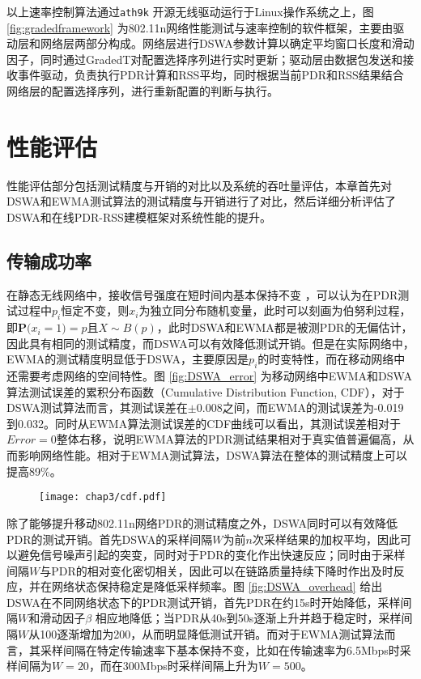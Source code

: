 以上速率控制算法通过\texttt{ath9k} 开源无线驱动运行于Linux操作系统之上，图 \ref{fig:gradedframework} 为802.11n网络性能测试与速率控制的软件框架，主要由驱动层和网络层两部分构成。网络层进行DSWA参数计算以确定平均窗口长度和滑动因子，同时通过GradedT对配置选择序列进行实时更新；驱动层由数据包发送和接收事件驱动，负责执行PDR计算和RSS平均，同时根据当前PDR和RSS结果结合网络层的配置选择序列，进行重新配置的判断与执行。

\section{性能评估}
\label{sec:evaluation80211n}

性能评估部分包括测试精度与开销的对比以及系统的吞吐量评估，本章首先对DSWA和EWMA测试算法的测试精度与开销进行了对比，然后详细分析评估了DSWA和在线PDR-RSS建模框架对系统性能的提升。

\subsection{传输成功率}
\label{sec:pdr}

在静态无线网络中，接收信号强度在短时间内基本保持不变 \cite{reis2006model}，可以认为在PDR测试过程中$p_i$恒定不变，则$x_i$为独立同分布随机变量，此时可以刻画为伯努利过程，即$\textbf{P(}x_i=1\textbf{)}=p$且$X\sim B(p)$，此时DSWA和EWMA都是被测PDR的无偏估计，因此具有相同的测试精度，而DSWA可以有效降低测试开销。但是在实际网络中，EWMA的测试精度明显低于DSWA，主要原因是$p_i$的时变特性，而在移动网络中还需要考虑网络的空间特性。图 \ref{fig:DSWA_error} 为移动网络中EWMA和DSWA算法测试误差的累积分布函数（Cumulative Distribution Function, CDF），对于DSWA测试算法而言，其测试误差在$\pm$0.008之间，而EWMA的测试误差为-0.019到0.032。同时从EWMA算法测试误差的CDF曲线可以看出，其测试误差相对于$Error=0$整体右移，说明EWMA算法的PDR测试结果相对于真实值普遍偏高，从而影响网络性能。相对于EWMA测试算法，DSWA算法在整体的测试精度上可以提高89\%。

\begin{figure}[!htp]
\centering
    \texttt{[image: chap3/cdf.pdf]}
\end{figure}

除了能够提升移动802.11n网络PDR的测试精度之外，DSWA同时可以有效降低PDR的测试开销。首先DSWA的采样间隔$W$为前$n$次采样结果的加权平均，因此可以避免信号噪声引起的突变，同时对于PDR的变化作出快速反应；同时由于采样间隔$W$与PDR的相对变化密切相关，因此可以在链路质量持续下降时作出及时反应，并在网络状态保持稳定是降低采样频率。图 \ref{fig:DSWA_overhead} 给出DSWA在不同网络状态下的PDR测试开销，首先PDR在约15s时开始降低，采样间隔$W$和滑动因子$\beta$ 相应地降低；当PDR从40s到50s逐渐上升并趋于稳定时，采样间隔$W$从100逐渐增加为200，从而明显降低测试开销。而对于EWMA测试算法而言，其采样间隔在特定传输速率下基本保持不变，比如在传输速率为6.5Mbps时采样间隔为$W=20$，而在300Mbps时采样间隔上升为$W=500$。

